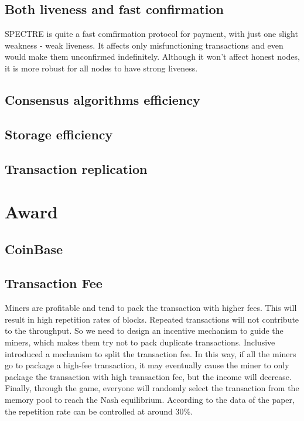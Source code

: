 \documentclass[a4paper,11pt]{article}
\begin{document}
\subsection{Both liveness and fast confirmation} 
SPECTRE is quite a fast comfirmation protocol for payment, with just one slight weakness - weak liveness. It affects only misfunctioning transactions and even would make them unconfirmed indefinitely. Although it won't affect honest nodes, it is more robust for all nodes to have strong liveness.

\subsection{Consensus algorithms efficiency} 

\subsection{Storage efficiency} 

\subsection{Transaction replication} 

\section{Award}

\subsection{CoinBase}

\subsection{Transaction Fee}

Miners are profitable and tend to pack the transaction with higher fees. This will result in high repetition rates of blocks. Repeated transactions will not contribute to the throughput. So we need to design an incentive mechanism to guide the miners, which makes them try not to pack duplicate transactions. Inclusive introduced a mechanism to split the transaction fee. In this way, if all the miners go to package a high-fee transaction, it may eventually cause the miner to only package the transaction with high transaction fee, but the income will decrease. Finally, through the game, everyone will randomly select the transaction from the memory pool to reach the Nash equilibrium. According to the data of the paper, the repetition rate can be controlled at around 30\%.
\end{document}
